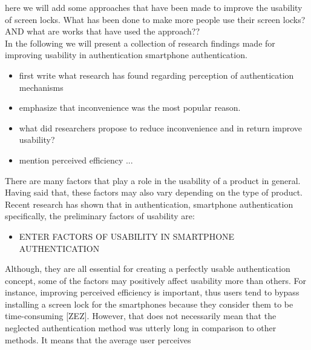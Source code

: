 here we will add some approaches that have been made to improve the usability of screen locks. What has been done to make more people use their screen locks? AND what are works that have used the approach??\\

In the following we will present a collection of research findings made for improving usability in authentication smartphone authentication. 
\begin{itemize}
    \item first write what research has found regarding perception of authentication mechanisms 
    \item emphasize that inconvenience was the most popular reason.
    \item what did researchers propose to reduce inconvenience and in return improve usability? 
    \item mention perceived efficiency ... 

\end{itemize}

There are many factors that play a role in the usability of a product in general. Having said that, these factors may also vary depending on the type of product. Recent research has shown that in authentication, smartphone authentication specifically, the preliminary factors of usability are: 

\begin{itemize}
    \item ENTER FACTORS OF USABILITY IN SMARTPHONE AUTHENTICATION
\end{itemize}

Although, they are all essential for creating a perfectly usable authentication concept, some of the factors may positively affect usability more than others. For instance, improving perceived efficiency is important, thus users tend to bypass installing a screen lock for the smartphones because they consider them to be time-consuming [ZEZ].  
However, that does not necessarily mean that the neglected authentication method was utterly long in comparison to other methods. It means that the average user perceives 



 

